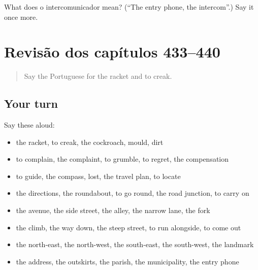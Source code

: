 \begin{tcolorbox}[breakable,colback=teal!4,colframe=teal!35!black,title={Before you move on}]
What does o intercomunicador mean? (\textquotedblleft{}The entry phone, the intercom\textquotedblright{}.) Say it once more.
\end{tcolorbox}
\section[(dialogue)]{Revisão dos capítulos 433–440}

\label{lesson:PT-R440-revisao-433-440}



\begin{quote}
Say the Portuguese for the racket and to creak.
\end{quote}

\subsection*{Your turn}
Say these aloud:

\begin{itemize}
\raggedright
  \item the racket, to creak, the cockroach, mould, dirt
  \item to complain, the complaint, to grumble, to regret, the compensation
  \item to guide, the compass, lost, the travel plan, to locate
  \item the directions, the roundabout, to go round, the road junction, to carry on
  \item the avenue, the side street, the alley, the narrow lane, the fork
  \item the climb, the way down, the steep street, to run alongside, to come out
  \item the north-east, the north-west, the south-east, the south-west, the landmark
  \item the address, the outskirts, the parish, the municipality, the entry phone
\end{itemize}

